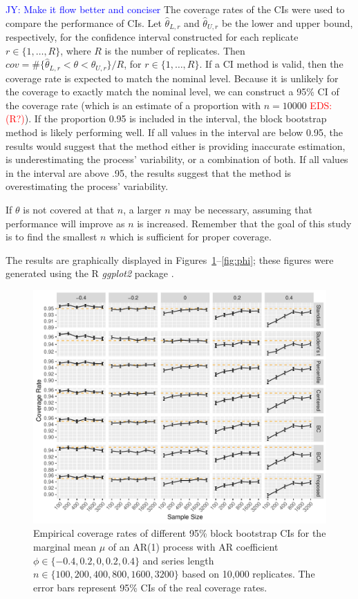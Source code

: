 \documentclass[12pt, letterpaper, titlepage]{article}
\newcommand{\jy}[1]{\textcolor{blue}{JY: #1}}
\newcommand{\eds}[1]{\textcolor{red}{EDS: (#1)}}
\begin{document}
\jy{Make it flow better and conciser}
The coverage rates of the CIs were used to compare the performance of CIs. Let
$\hat\theta_{L, r}$ and $\hat\theta_{U, r}$ be the lower and upper bound,
respectively, for the confidence interval constructed for each replicate
$r \in \{1, \ldots, R\}$, where $R$ is the
number of replicates.
Then $cov = \#\{\hat\theta_{L, r} < \theta < \hat\theta_{U, r} \}/R$,  
for $r \in \{1, \ldots, R\}$.
If a CI method is valid, then the coverage rate is expected to match the
nominal 
level. Because it is unlikely for the coverage to exactly match the nominal
level,
we can construct a 95\% CI of the coverage
rate (which is an estimate of a proportion with $n = 10000$ \eds{R?}). If the
proportion
0.95 is included in the interval, the block bootstrap method is likely
performing
well. If all values in the interval are below 0.95, the results would suggest 
that the
method either is providing inaccurate estimation, is underestimating the
process' variability, or a combination of both. If all values in the interval
are above .95, the results suggest that the method is overestimating the
process' variability.

If $\theta$ is not covered at that $n$, a larger $n$ may be
necessary, assuming that performance will improve as $n$ is increased.
Remember that
the goal of this study is to find the smallest $n$ which is sufficient for
proper coverage.

The results are graphically displayed in Figures~\ref{fig:mu}--\ref{fig:phi};
these figures were generated using the R \textsl{ggplot2} package
\citep{ggplot2}.

\begin{figure}[tbp]
  \centering
  \includegraphics[width=\textwidth]{figures/plot_mu}
  \caption{Empirical coverage rates of different 95\% block bootstrap CIs for
    the marginal mean $\mu$ of an AR(1) process with AR coefficient
    $\phi \in \{-0.4, 0.2, 0, 0.2, 0.4\}$ and series length
    $n \in \{100, 200, 400, 800, 1600, 3200\}$ based on 10,000 replicates.
    The error bars represent 95\% CIs of the real coverage rates.}
  \label{fig:mu}
\end{figure}
\end{document}
